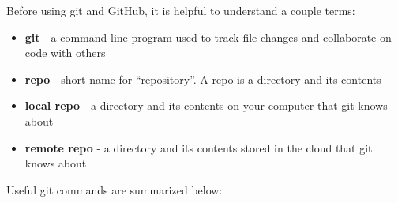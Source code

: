 \documentclass{book}
\providecommand{\tightlist}{%
      \setlength{\itemsep}{0pt}\setlength{\parskip}{0pt}}
\begin{document}
    
        Before using git and GitHub, it is helpful to understand a couple terms:

\begin{itemize}
\tightlist
\item
  \textbf{git} - a command line program used to track file changes and
  collaborate on code with others
\item
  \textbf{repo} - short name for ``repository''. A repo is a directory
  and its contents
\item
  \textbf{local repo} - a directory and its contents on your computer
  that git knows about
\item
  \textbf{remote repo} - a directory and its contents stored in the
  cloud that git knows about
\end{itemize}
    




    
        Useful git commands are summarized below:
\end{document}
